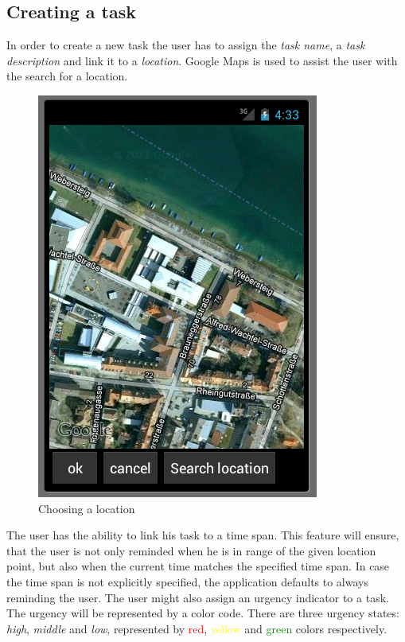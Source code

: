 \subsection{Creating a task}
In order to create a new task the user has to assign the \emph{task name}, a
\emph{task description} and link it to a \emph{location}. Google Maps is used to
assist the user with the search for a location.
 \begin{figure}[h]
  \caption{Choosing a location}
  \center
  	\includegraphics[scale=0.25]{../resources/choose-location.png}
\end{figure}
The user has the ability to link his task to a time span. This feature will
ensure, that the user is not only reminded when he is in range of the given
location point, but also when the current time matches the specified time span.
In case the time span is not explicitly specified, the application defaults to
always reminding the user. The user might also assign an urgency indicator to a
task. The urgency will be represented by a color code. There are three urgency
states: \emph{high}, \emph{middle} and \emph{low}, represented by
\textcolor{red}{red}, \textcolor{yellow}{yellow} and \textcolor{green}{green}
colors respectively.
